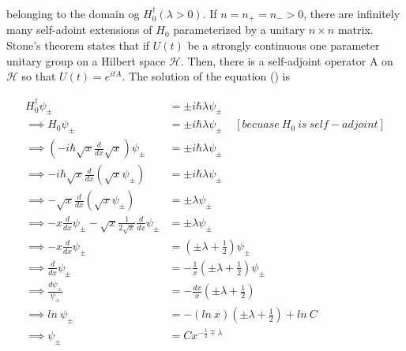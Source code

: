 \documentclass[12pt]{report}
\newcommand*{\1}{\hspace{1pt}}
\begin{document}
        belonging to the domain og $H_{0}^{\dagger}(\lambda>0)$. If $n=n_{+}=n_{-}>0$, there are infinitely many self-adoint extensions of $H_{0}$ parameterized by a 
        unitary $n\times n$ matrix. Stone's theorem states that if $U(t)$ be a strongly continuous one parameter unitary group on a Hilbert space $\mathcal{H}$. 
        Then, there is a self-adjoint operator A on $\mathcal{H}$ so that $U(t) = e^{itA}$. The solution of the equation () is 

        \begin{align*}
            H_{0}^{\dagger} \psi_{\pm} &= \pm i \hbar \lambda \psi_{\pm} \\ 
            \implies H_{0} \psi_{\pm} &= \pm i \hbar \lambda \psi_{\pm} \ \ \ \ \ [becuase\ H_{0} \ is \ self-adjoint] \\
            \implies \left(-i\hbar \sqrt{x} \frac{d}{dx}\sqrt{x}\right)\psi_{\pm} &= \pm i \hbar \lambda \psi _{\pm} \\
            \implies -i\hbar \sqrt{x} \frac{d}{dx}\left(\sqrt{x}\psi_{\pm}\right) &= \pm i \hbar \lambda \psi _{\pm} \\
            \implies -\sqrt{x} \frac{d}{dx}\left(\sqrt{x}\psi_{\pm}\right) &= \pm \lambda \psi _{\pm} \\
            \implies -x\frac{d}{dx}\psi_{\pm} - \sqrt{x}\frac{1}{2\sqrt{x}} \frac{d}{dx}\psi_{\pm} &= \pm \lambda \psi _{\pm} \\
            \implies -x\frac{d}{dx}\psi_{\pm} &= \left(\pm \lambda + \frac{1}{2}\right) \psi _{\pm} \\
            \implies \frac{d}{dx}\psi_{\pm} &= -\frac{1}{x}\left(\pm \lambda + \frac{1}{2}\right) \psi _{\pm} \\
            \implies \frac{d\psi_{\pm}}{\psi_{\pm}} &= -\frac{dx}{x}\left(\pm \lambda + \frac{1}{2}\right) \\
            \implies ln \ \psi_{\pm} &= -\left(ln \ x\right)\left(\pm \lambda + \frac{1}{2}\right) + ln \ C\\
            \implies \psi_{\pm} &=  Cx^{- \frac{1}{2}\mp \lambda}\\
        \end{align*}
\end{document}
